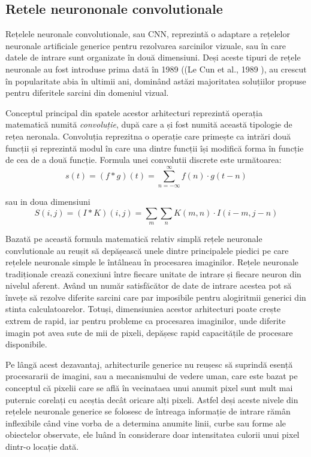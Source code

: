 \documentclass[a4paper,12pt]{book}
\begin{document}
			\subsection{Retele neurononale convolutionale} \label{cnns}
				Rețelele neuronale convolutionale, sau CNN, reprezintă o adaptare a rețelelor neuronale artificiale generice pentru rezolvarea sarcinilor vizuale, sau în care datele de intrare sunt organizate în două dimensiuni. Deși aceste tipuri de rețele neuronale au fost introduse prima dată în 1989 ((Le Cun et al., 1989 \cite{leCun}), au crescut în popularitate abia în ultimii ani, dominând astăzi majoritatea soluțiilor propuse pentru diferitele sarcini din domeniul vizual. \par 
				Conceptul principal din spatele acestor arhitecturi reprezintă operația matematică numită \textit{convoluție}, după care a și fost numită această tipologie de rețea neronala. Convoluția reprezitna o operație care primește ca intrări două funcții și reprezintă modul în care una dintre funcții își modifică forma în funcție de cea de a două funcție. Formula unei convolutii discrete este următoarea:
				\begin{equation*}
					s(t) = (f*g)(t) = \sum_{n=-\infty}^{\infty} f(n) \cdot g(t - n)
				\end{equation*}	\par
				\noindent sau in doua dimensiuni
				\begin{equation}\label{convo}				
					S(i, j) = (I*K)(i, j) = \sum_{m} \sum_{n} K(m, n) \cdot I(i - m, j - n)
				\end{equation}
				
				Bazată pe această formula matematică relativ simplă rețele neuronale convlutionale au reușit să depășească unele dintre principalele piedici pe care rețelele neuronale simple le întâlneau în procesarea imaginilor. Rețele neuronale tradiționale crează conexiuni între fiecare unitate de intrare și fiecare neuron din nivelul aferent. Având un număr satisfăcător de date de intrare acestea pot să învețe să rezolve diferite sarcini care par imposibile pentru alogiritmii generici din stinta calculatoarelor. Totuși, dimensiuniea acestor arhitecturi poate crește extrem de rapid, iar pentru probleme ca procesarea imaginilor, unde diferite imagin pot avea sute de mii de pixeli, depășesc rapid capacitățile de procesare disponibile. \par
				Pe lângă acest dezavantaj, arhitecturile generice nu reușesc să suprindă esență procesararii de imagini, sau a mecanismului de vedere uman, care este bazat pe conceptul că pixelii care se află în vecinataea unui anumit pixel sunt mult mai puternic corelați cu aceștia decât oricare alți pixeli. Astfel deși aceste nivele din rețelele neuronale generice se folosesc de întreaga informație de intrare rămân inflexibile când vine vorba de a determina anumite linii, curbe sau forme ale obiectelor observate, ele luând în considerare doar intensitatea culorii unui pixel dintr-o locație dată. \par
				
\end{document}
